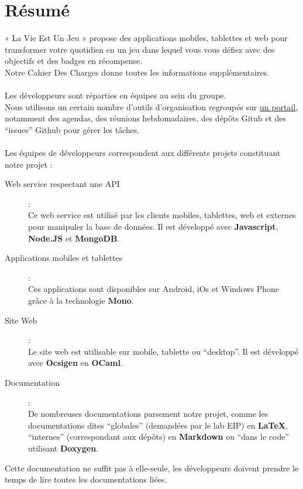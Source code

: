 \documentclass{life-fr}
\begin{document}
\chapter*{Résumé}
{
  « La Vie Est Un Jeu » propose des applications mobiles, tablettes et
  web pour transformer votre quotidien en un jeu dans lequel vous vous
  défiez avec des objectifs et des badges en récompense.\\
  Notre Cahier Des Charges donne toutes les informations supplémentaires.\\
  \\
  Les développeurs sont réparties en équipes au sein du groupe.\\
  Nous utilisons un certain nombre d'outils d'organisation regroupés sur
  \href{http://life.paysdu42.fr/}{un portail}, notamment des agendas, des
  réunions hebdomadaires, des dépôts Gitub et des ``issues'' Github pour gérer
  les tâches.\\
  \\
  Les équipes de développeurs correspondent aux différents projets constituant
  notre projet :\\
  \begin{description}
    \item [Web service respectant une API] :\\
      Ce web service est utilisé par les clients mobiles, tablettes, web et
      externes pour manipuler la base de données. Il est développé avec
      \textbf{Javascript}, \textbf{Node.JS} et \textbf{MongoDB}.
    \item [Applications mobiles et tablettes] :\\
      Ces applications sont disponibles sur Android, iOs et Windows Phone
      grâce à la technologie \textbf{Mono}.
    \item [Site Web] :\\
      Le site web est utilisable sur mobile, tablette ou ``desktop''. Il
      est développé avec \textbf{Ocsigen} en \textbf{OCaml}.
    \item [Documentation] :\\
      De nombreuses documentations parsement notre projet, comme les
      documentations dites ``globales'' (demandées par le lab EIP) en
      \textbf{LaTeX}, ``internes'' (correspondant aux dépôts) en
      \textbf{Markdown} ou ``dans le code'' utilisant \textbf{Doxygen}.
  \end{description}

  \vspace{10pt}
  Cette documentation ne suffit pas à elle-seule, les développeurs
  doivent prendre le temps de lire toutes les documentations liées.
}
\end{document}
